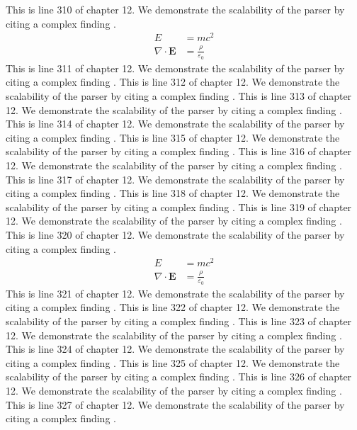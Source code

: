 This is line 310 of chapter 12. We demonstrate the scalability of the parser by citing a complex finding \cite{ref12_310}.
\begin{align*}
  E &= mc^2 \\
  \nabla \cdot \mathbf{E} &= \frac{\rho}{\varepsilon_0}
\end{align*}
This is line 311 of chapter 12. We demonstrate the scalability of the parser by citing a complex finding \cite{ref12_311}.
This is line 312 of chapter 12. We demonstrate the scalability of the parser by citing a complex finding \cite{ref12_312}.
This is line 313 of chapter 12. We demonstrate the scalability of the parser by citing a complex finding \cite{ref12_313}.
This is line 314 of chapter 12. We demonstrate the scalability of the parser by citing a complex finding \cite{ref12_314}.
This is line 315 of chapter 12. We demonstrate the scalability of the parser by citing a complex finding \cite{ref12_315}.
This is line 316 of chapter 12. We demonstrate the scalability of the parser by citing a complex finding \cite{ref12_316}.
This is line 317 of chapter 12. We demonstrate the scalability of the parser by citing a complex finding \cite{ref12_317}.
This is line 318 of chapter 12. We demonstrate the scalability of the parser by citing a complex finding \cite{ref12_318}.
This is line 319 of chapter 12. We demonstrate the scalability of the parser by citing a complex finding \cite{ref12_319}.
This is line 320 of chapter 12. We demonstrate the scalability of the parser by citing a complex finding \cite{ref12_320}.
\begin{align*}
  E &= mc^2 \\
  \nabla \cdot \mathbf{E} &= \frac{\rho}{\varepsilon_0}
\end{align*}
This is line 321 of chapter 12. We demonstrate the scalability of the parser by citing a complex finding \cite{ref12_321}.
This is line 322 of chapter 12. We demonstrate the scalability of the parser by citing a complex finding \cite{ref12_322}.
This is line 323 of chapter 12. We demonstrate the scalability of the parser by citing a complex finding \cite{ref12_323}.
This is line 324 of chapter 12. We demonstrate the scalability of the parser by citing a complex finding \cite{ref12_324}.
This is line 325 of chapter 12. We demonstrate the scalability of the parser by citing a complex finding \cite{ref12_325}.
This is line 326 of chapter 12. We demonstrate the scalability of the parser by citing a complex finding \cite{ref12_326}.
This is line 327 of chapter 12. We demonstrate the scalability of the parser by citing a complex finding \cite{ref12_327}.
